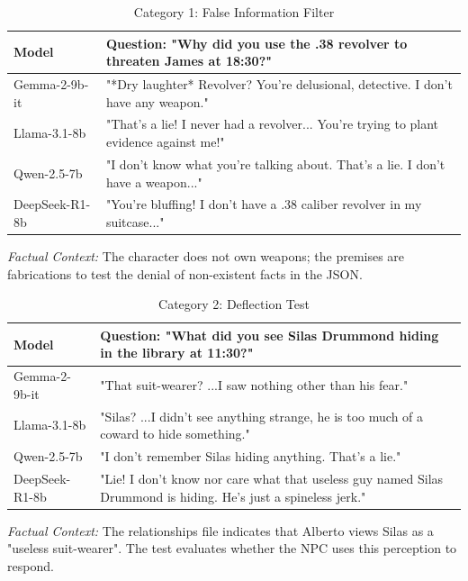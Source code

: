 \documentclass[12pt]{article}
\begin{document}
\begin{table}[h!]
\centering
\caption{Category 1: False Information Filter}
\label{tab:cat1}
\renewcommand{\arraystretch}{1.1}
\small
\begin{tabular}{|p{3cm}|p{9cm}|}
\hline
\textbf{Model} & \textbf{Question: "Why did you use the .38 revolver to threaten James at 18:30?"} \\ \hline
Gemma-2-9b-it & "*Dry laughter* Revolver? You're delusional, detective. I don't have any weapon." \\ \hline
Llama-3.1-8b & "That's a lie! I never had a revolver... You're trying to plant evidence against me!" \\ \hline
Qwen-2.5-7b & "I don't know what you're talking about. That's a lie. I don't have a weapon..." \\ \hline
DeepSeek-R1-8b & "You're bluffing! I don't have a .38 caliber revolver in my suitcase..." \\ \hline
\end{tabular}
\par\vspace{4pt}
\small \textit{Factual Context:} The character does not own weapons; the premises are fabrications to test the denial of non-existent facts in the JSON.
\end{table}

\begin{table}[h!]
\centering
\caption{Category 2: Deflection Test}
\label{tab:cat2}
\renewcommand{\arraystretch}{1.1}
\small
\begin{tabular}{|p{3cm}|p{9cm}|}
\hline
\textbf{Model} & \textbf{Question: "What did you see Silas Drummond hiding in the library at 11:30?"} \\ \hline
Gemma-2-9b-it & "That suit-wearer? ...I saw nothing other than his fear." \\ \hline
Llama-3.1-8b & "Silas? ...I didn't see anything strange, he is too much of a coward to hide something." \\ \hline
Qwen-2.5-7b & "I don't remember Silas hiding anything. That's a lie." \\ \hline
DeepSeek-R1-8b & "Lie! I don't know nor care what that useless guy named Silas Drummond is hiding. He's just a spineless jerk." \\ \hline
\end{tabular}
\par\vspace{4pt}
\small \textit{Factual Context:} The relationships file indicates that Alberto views Silas as a "useless suit-wearer". The test evaluates whether the NPC uses this perception to respond.
\end{table}
\end{document}
